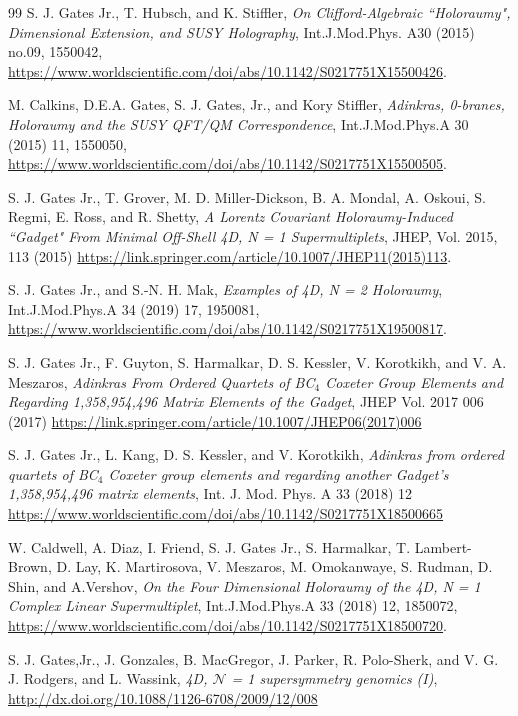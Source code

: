 \documentclass[12pt]{article}
\begin{document}
\begin{thebibliography}{99}
S. J. Gates Jr., T. Hubsch, and K. Stiffler,
{\em On Clifford-Algebraic ``Holoraumy", Dimensional Extension, and SUSY Holography},
Int.J.Mod.Phys. A30 (2015) no.09, 1550042, 
\url{https://www.worldscientific.com/doi/abs/10.1142/S0217751X15500426}.
 
M. Calkins, D.E.A. Gates, S. J. Gates, Jr., and Kory Stiffler, {\em Adinkras, 0-branes, Holoraumy and the SUSY QFT/QM Correspondence},
Int.J.Mod.Phys.A 30 (2015) 11, 1550050,
\url{https://www.worldscientific.com/doi/abs/10.1142/S0217751X15500505}.
  
S. J. Gates Jr., T. Grover, M. D. Miller-Dickson, B. A. Mondal, A. Oskoui, S. Regmi, E. Ross, and R. Shetty, {\em A Lorentz Covariant Holoraumy-Induced ``Gadget" From Minimal Off-Shell 4D, N = 1 Supermultiplets}, JHEP, Vol. 2015, 113 (2015)  \url{https://link.springer.com/article/10.1007/JHEP11(2015)113}.
 
S. J. Gates Jr., and S.-N. H. Mak,
{\em Examples of 4D, N = 2 Holoraumy},
Int.J.Mod.Phys.A 34 (2019) 17, 1950081,
\url{https://www.worldscientific.com/doi/abs/10.1142/S0217751X19500817}.

S. J. Gates Jr., F. Guyton, S. Harmalkar, D. S. Kessler, V. Korotkikh, and V. A. Meszaros,
{\em Adinkras From Ordered Quartets of BC${}_4$ Coxeter Group Elements and 
Regarding 1,358,954,496 Matrix Elements of the Gadget},
JHEP Vol. 2017 006 (2017)
\url{https://link.springer.com/article/10.1007/JHEP06(2017)006}

S. J. Gates Jr., L. Kang, D. S. Kessler, and V. Korotkikh,
{\em Adinkras from ordered quartets of BC${}_4$ Coxeter group elements and regarding 
another Gadget's 1,358,954,496 matrix elements},
Int. J. Mod. Phys. A 33 (2018) 12
\url{https://www.worldscientific.com/doi/abs/10.1142/S0217751X18500665}

W. Caldwell, A. Diaz, I. Friend, S. J. Gates Jr., S. Harmalkar, T. Lambert-Brown, D. Lay, K. Martirosova, V. Meszaros, M. Omokanwaye, S. Rudman, D. Shin, and A.Vershov,
{\em On the Four Dimensional Holoraumy of the 4D, N = 1 Complex Linear Supermultiplet},
 Int.J.Mod.Phys.A 33 (2018) 12, 1850072,
\url{https://www.worldscientific.com/doi/abs/10.1142/S0217751X18500720}.

S. J. Gates,Jr., J. Gonzales, B. MacGregor, J. Parker, 
R. Polo-Sherk, and V. G. J. Rodgers, and L. Wassink, {\em 4D, $\mathcal{N}$ = 1 supersymmetry genomics (I)},
\url{http://dx.doi.org/10.1088/1126-6708/2009/12/008}


\end{thebibliography}
\end{document}

